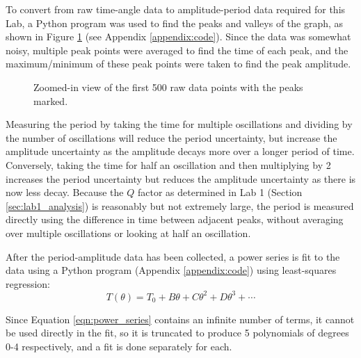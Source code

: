 \documentclass[aps,twocolumn,secnumarabic,nobalancelastpage,amsmath,amssymb,nofootinbib,floatfix,letterpaper]{revtex4}
\begin{document}
To convert from raw time-angle data to amplitude-period data required for this Lab, a Python program was used to find
the peaks and valleys of the graph, as shown in Figure \ref{fig:rawdata} (see Appendix \ref{appendix:code}).
Since the data was somewhat noisy, multiple peak points were averaged to find the time of each peak, and the
maximum/minimum of these peak points were taken to find the peak amplitude.

\begin{figure}[htb]
    \caption{Zoomed-in view of the first 500 raw data points with the peaks marked.}
    \label{fig:rawdata}
\end{figure}

Measuring the period by taking the time for multiple oscillations and dividing by the number of oscillations will reduce
the period uncertainty, but increase the amplitude uncertainty as the amplitude decays more over a longer period of
time. Conversely, taking the time for half an oscillation and then multiplying by 2 increases the period uncertainty but
reduces the amplitude uncertainty as there is now less decay. Because the \(Q\) factor as determined in Lab 1 (Section
\ref{sec:lab1_analysis}) is reasonably but not extremely large, the period is measured directly using the difference in
time between adjacent peaks, without averaging over multiple oscillations or looking at half an oscillation.

After the period-amplitude data has been collected, a power series is fit to the data using a Python program
(Appendix \ref{appendix:code}) using least-squares regression:
\begin{equation}
    T(\theta) = T_0 + B\theta + C\theta^2 + D\theta^3 + \cdots
    \label{eqn:power_series}
\end{equation}

Since Equation \ref{eqn:power_series} contains an infinite number of terms, it cannot be used directly in the fit, so it
is truncated to produce 5 polynomials of degrees 0-4 respectively, and a fit is done separately for each.
\end{document}
